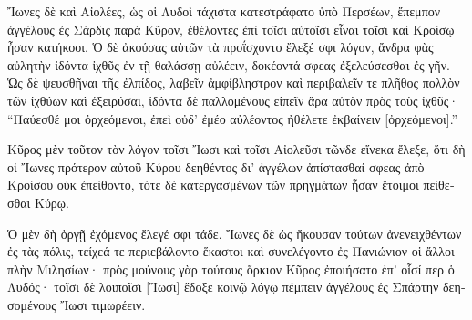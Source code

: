 
\medskip

\begin{greek}
{\large
{ \noindent Ἴωνες δὲ καὶ Αἰολέες, ὡς οἱ Λυδοὶ τάχιστα κατεστράφατο ὑπὸ Περσέων, ἔπεμπον ἀγγέλους ἐς Σάρδις παρὰ Κῦρον, ἐθέλοντες ἐπὶ τοῖσι αὐτοῖσι εἶναι τοῖσι καὶ Κροίσῳ ἦσαν κατήκοοι. Ὁ δὲ ἀκούσας αὐτῶν τὰ προΐσχοντο ἔλεξέ σφι λόγον, ἄνδρα φὰς αὐλητὴν ἰδόντα ἰχθῦς ἐν τῇ θαλάσσῃ αὐλέειν, δοκέοντά σφεας ἐξελεύσεσθαι ἐς γῆν. Ὡς δὲ ψευσθῆναι τῆς ἐλπίδος, λαβεῖν ἀμφίβληστρον καὶ περιβαλεῖν τε πλῆθος πολλὸν τῶν ἰχθύων καὶ ἐξειρύσαι, ἰδόντα δὲ παλλομένους εἰπεῖν ἄρα αὐτὸν πρὸς τοὺς ἰχθῦς· ``Παύεσθέ μοι ὀρχεόμενοι, ἐπεὶ οὐδ' ἐμέο αὐλέοντος ἠθέλετε ἐκβαίνειν [ὀρχεόμενοι].'' 

Κῦρος μὲν τοῦτον τὸν λόγον τοῖσι Ἴωσι καὶ τοῖσι Αἰολεῦσι τῶνδε εἵνεκα ἔλεξε, ὅτι δὴ οἱ Ἴωνες πρότερον αὐτοῦ Κύρου δεηθέντος δι' ἀγγέλων ἀπίστασθαί σφεας ἀπὸ Κροίσου οὐκ ἐπείθοντο, τότε δὲ κατεργασμένων τῶν πρηγμάτων ἦσαν ἕτοιμοι πείθεσθαι Κύρῳ. 

Ὁ μὲν δὴ ὀργῇ ἐχόμενος ἔλεγέ σφι τάδε.  Ἴωνες δὲ ὡς ἤκουσαν τούτων ἀνενειχθέντων ἐς τὰς πόλις, τείχεά τε περιεβάλοντο ἕκαστοι καὶ συνελέγοντο ἐς Πανιώνιον οἱ ἄλλοι πλὴν Μιλησίων· πρὸς μούνους γὰρ τούτους ὅρκιον Κῦρος ἐποιήσατο ἐπ' οἷσί περ ὁ Λυδός· τοῖσι δὲ λοιποῖσι [Ἴωσι] ἔδοξε κοινῷ λόγῳ πέμπειν ἀγγέλους ἐς Σπάρτην δεησομένους Ἴωσι τιμωρέειν.
}
}
\end{greek}
